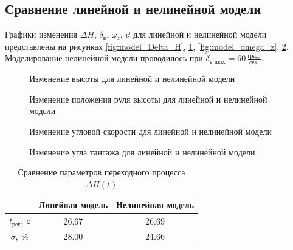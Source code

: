 \subsection{Сравнение линейной и нелинейной модели}

Графики изменения $\Delta H$, $\delta_{в}$, $\omega_z$, $\vartheta$ для
линейной и нелинейной модели представлены на рисунках \ref{fig:model_Delta_H},
\ref{fig:delta_elevator}, \ref{fig:model_omega_z}, \ref{fig:model_theta}.
Моделирование нелинейной модели проводилось при 
$\dot{\delta}_\text{в max} = 60\, \frac{\text{град.}}{\text{сек.}}$.

\begin{figure}[H]
    \begin{minipage}{0.48\textwidth}
    \centering
    \resizebox{1.1\linewidth}{!}{}
    \caption{Изменение высоты для линейной и нелинейной модели}
    \label{fig:model_Delta_H}
    \end{minipage}
    \hfill
    \begin{minipage}{0.48\textwidth}
    \centering
    \resizebox{1.1\linewidth}{!}{}
    \caption{Изменение положения руля высоты для линейной и нелинейной модели}
    \label{fig:delta_elevator}
    \end{minipage}
\end{figure}

\begin{figure}[H]
    \begin{minipage}{0.48\textwidth}
    \centering
    \resizebox{1.1\linewidth}{!}{}
    \caption{Изменение угловой скорости для линейной и нелинейной модели}
    \label{fig:model_omega_z}
    \end{minipage}
    \hfill
    \begin{minipage}{0.48\textwidth}
    \centering
    \resizebox{1.1\linewidth}{!}{}
    \caption{Изменение угла тангажа для линейной и нелинейной модели}
    \label{fig:model_theta}
\end{minipage}
\end{figure}

\begin{table}[htpb]
    \centering
    \caption{Сравнение параметров переходного процесса $\Delta H(t)$}
    \label{tab:stat_lin_nonlin}
    \begin{tabular}{|c|c|c|}
        \hline
        {} &  Линейная модель &  Нелинейная модель \\
        \hline
        $t_{рег},\ с$ &            26.67 &              26.69 \\
        \hline
        $\sigma,\ \%$ &            28.00 &              24.66 \\
        \hline
    \end{tabular}
\end{table}

